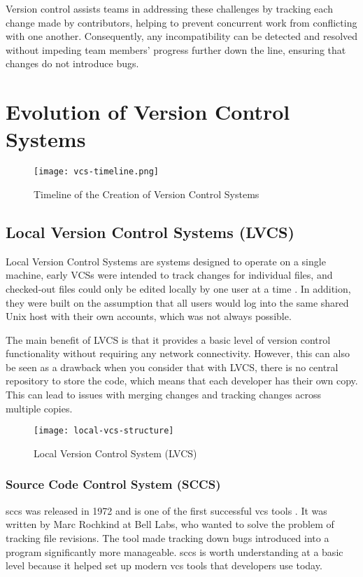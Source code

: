 Version control assists teams in addressing these challenges by tracking each change made by contributors, helping to prevent concurrent work from conflicting with one another. Consequently, any incompatibility can be detected and resolved without impeding team members' progress further down the line, ensuring that changes do not introduce bugs.

\section{Evolution of Version Control Systems}
\noindent
\begin{figure}[htbp]
    \centering
    \texttt{[image: vcs-timeline.png]}
    \caption{Timeline of the Creation of Version Control Systems \cite{stopak_2019}}
    \label{fig:vcs-timeline}
\end{figure}
\subsection{Local Version Control Systems (LVCS)}
Local Version Control Systems are systems designed to operate on a single machine, early VCSs were intended to track changes for individual files, and checked-out files could only be edited locally by one user at a time \cite{stopak_2019}. In addition, they were built on the assumption that all users would log into the same shared Unix host with their own accounts, which was not always possible.
\smallskip

The main benefit of LVCS is that it provides a basic level of version control functionality without requiring any network connectivity. However, this can also be seen as a drawback when you consider that with LVCS, there is no central repository to store the code, which means that each developer has their own copy. This can lead to issues with merging changes and tracking changes across multiple copies.

\begin{figure}[htbp]
    \centering
    \texttt{[image: local-vcs-structure]}
    \caption{Local Version Control System (LVCS)}
    \label{fig:lvcs-structure}
\end{figure}

\subsubsection{Source Code Control System (SCCS)}
\label{sec:sccs}
\acrlong{sccs} was released in 1972 and is one of the first successful \acrshort{vcs} tools \cite{stopak_2019}. It was written by Marc Rochkind at Bell Labs, who wanted to solve the problem of tracking file revisions. The tool made tracking down bugs introduced into a program significantly more manageable. \acrshort{sccs} is worth understanding at a basic level because it helped set up modern \acrshort{vcs} tools that developers use today.
